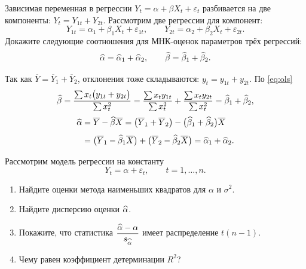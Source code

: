 
Зависимая переменная в регрессии $Y_t = \alpha + \beta X_t + \varepsilon_t$
разбивается на две компоненты: $Y_t = Y_{1t} + Y_{2t}$. Рассмотрим две регрессии
для компонент:
\[
  Y_{1t} = \alpha_1 + \beta_1 X_t + \varepsilon_{1t},
  \qquad
  Y_{2t} = \alpha_2 + \beta_2 X_t + \varepsilon_{2t}.
\]
Докажите следующие соотношения для МНК-оценок параметров трёх регрессий:
\[
  \widehat{\alpha} = \widehat{\alpha}_1 + \widehat{\alpha}_2,
  \qquad
  \widehat{\beta} = \widehat{\beta}_1 + \widehat{\beta}_2 .
\]

\begin{solution}
Так как $\overline{Y} = \overline{Y}_1 + \overline{Y}_2$, отклонения тоже
складываются: $y_t = y_{1t} + y_{2t}$. По \eqref{eq:ols}
\[
  \widehat{\beta} = \frac{\sum x_t\bigl(y_{1t} + y_{2t}\bigr)}{\sum x_t^2}
      = \frac{\sum x_ty_{1t}}{\sum x_t^2} + \frac{\sum x_ty_{2t}}{\sum x_t^2}
      = \widehat{\beta}_1 + \widehat{\beta}_2,
\]
\[
\begin{aligned}
  \widehat{\alpha} &= \overline{Y} - \widehat{\beta}\overline{X}
       = \bigl(\overline{Y}_1 + \overline{Y}_2\bigr)
         - \bigl(\widehat{\beta}_1 + \widehat{\beta}_2\bigr)\overline{X} \\[4pt]
      &= \bigl(\overline{Y}_1 - \widehat{\beta}_1\overline{X}\bigr)
       + \bigl(\overline{Y}_2 - \widehat{\beta}_2\overline{X}\bigr)
       = \widehat{\alpha}_1 + \widehat{\alpha}_2 .
\end{aligned}
\]
\end{solution}


Рассмотрим модель регрессии на константу
\[
  Y_t = \alpha + \varepsilon_t, \qquad t = 1,\dots,n .
\]
\begin{enumerate}[label=\asbuk*), leftmargin=2.2em, itemsep=3pt]
  \item Найдите оценки метода наименьших квадратов для $\alpha$ и $\sigma^2$.
  \item Найдите дисперсию оценки $\widehat{\alpha}$.
  \item Покажите, что статистика $\dfrac{\widehat{\alpha} - \alpha}{s_{\widehat{\alpha}}}$ имеет
        распределение $t(n-1)$.
  \item Чему равен коэффициент детерминации $R^2$?
\end{enumerate}

